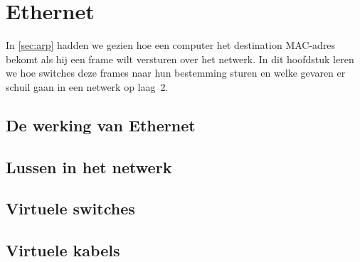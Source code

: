 \section{Ethernet}
\label{sec:ethernet}

In \vref{sec:arp} hadden we gezien hoe een computer het destination MAC-adres bekomt als hij een frame wilt versturen over het netwerk.
In dit hoofdstuk leren we hoe switches deze frames naar hun bestemming sturen en welke gevaren er schuil gaan in een netwerk op laag~2.



\subsection{De werking van Ethernet}

\subsection{Lussen in het netwerk}


\subsection{Virtuele switches}


\subsection{Virtuele kabels}

